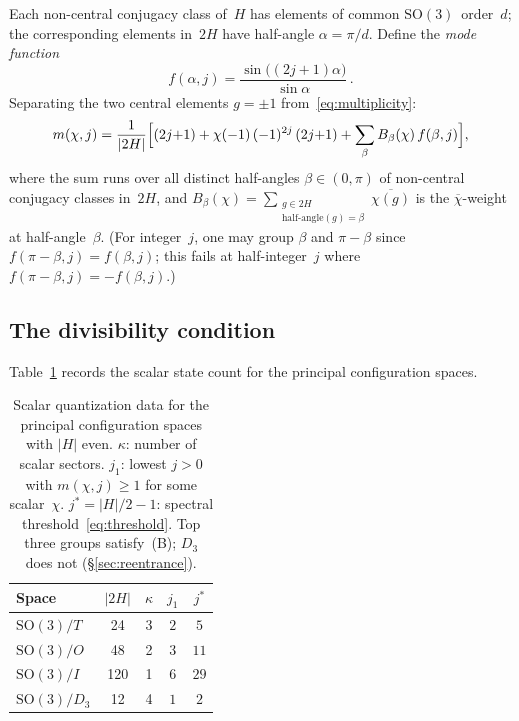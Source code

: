 \documentclass[12pt]{article}
\theoremstyle{definition}
\theoremstyle{remark}
\newcommand{\SO}{\mathrm{SO}}
\begin{document}
Each non-central conjugacy class of~$H$ has elements of
common $\SO(3)$~order~$d$; the corresponding elements
in~$2H$ have half-angle $\alpha = \pi/d$.
Define the \emph{mode function}
\begin{equation}
  \label{eq:mode}
  f(\alpha, j)
  = \frac{\sin\bigl((2j{+}1)\alpha\bigr)}{\sin\alpha}\,.
\end{equation}
Separating the two central elements $g = \pm 1$
from~\eqref{eq:multiplicity}:
\begin{equation}
  \label{eq:mode-decomposition}
  m(\chi, j)
  = \frac{1}{|2H|}
    \Bigl[
      (2j{+}1) + \chi(-1)\,(-1)^{2j}\,(2j{+}1)
      + \sum_{\beta} B_\beta(\chi)\, f(\beta, j)
    \Bigr],
\end{equation}
where the sum runs over all distinct half-angles
$\beta \in (0,\pi)$ of non-central conjugacy classes
in~$2H$, and
$B_\beta(\chi)
= \sum_{\substack{g \in 2H\\
\text{half-angle}(g)=\beta}}
\overline{\chi(g)}$
is the $\overline{\chi}$-weight at half-angle~$\beta$.
(For integer~$j$, one may group $\beta$ and
$\pi{-}\beta$ since
$f(\pi{-}\beta,j) = f(\beta,j)$; this fails at
half-integer~$j$ where
$f(\pi{-}\beta,j) = -f(\beta,j)$.)

\subsection{The divisibility condition}
\label{sec:divisibility}

Table~\ref{tab:spectral} records the scalar state count
for the principal configuration spaces.

\begin{table}[ht]
\centering
\begin{tabular}{@{}lcccc@{}}
  \toprule
  Space & $|2H|$ & $\kappa$ & $j_1$
        & $j^*$ \\
  \midrule
  $\SO(3)/T$   &   24 & 3 & $2$
    & $5$   \\
  $\SO(3)/O$   &   48 & 2 & $3$
    & $11$  \\
  $\SO(3)/I$   &  120 & 1 & $6$
    & $29$ \\
  \midrule
  $\SO(3)/D_3$ &   12 & 4 & $1$
    & $2$   \\
  \bottomrule
\end{tabular}
\caption{Scalar quantization data for the principal
  configuration spaces with $|H|$ even.
  $\kappa$: number of scalar sectors.
  $j_1$: lowest $j > 0$ with $m(\chi, j) \geq 1$
  for some scalar~$\chi$.
  $j^* = |H|/2 - 1$: spectral threshold~\eqref{eq:threshold}.
  Top three groups satisfy~(B); $D_3$ does not
  (\S\ref{sec:reentrance}).}
\label{tab:spectral}
\end{table}
\end{document}
